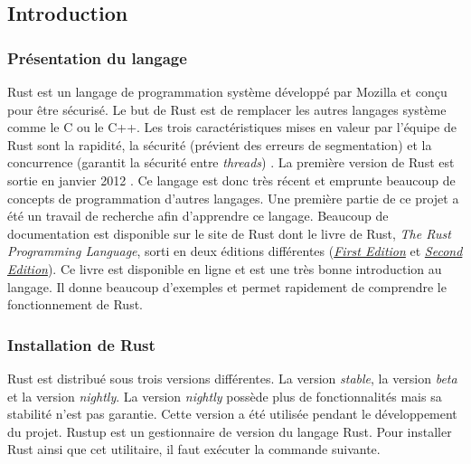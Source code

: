 
\subsection{Introduction}
\subsubsection{Présentation du langage}
Rust est un langage de programmation système développé par Mozilla et conçu pour
être sécurisé. Le but de Rust est de remplacer les autres langages système comme
le C ou le C++. Les trois caractéristiques mises en valeur par l'équipe de Rust
sont la rapidité, la sécurité (prévient des erreurs de segmentation) et la concurrence
(garantit la sécurité entre \textit{threads}) \cite{ref27}. La première version
de Rust est sortie en janvier 2012 \cite{ref28}. Ce langage est donc très récent
et emprunte beaucoup de concepts de programmation d'autres langages. Une première
partie de ce projet a été un travail de recherche afin d'apprendre ce langage.
Beaucoup de documentation est disponible sur le site de Rust dont le livre
de Rust, \textit{The Rust Programming Language}, sorti en deux éditions différentes
(\href{https://doc.rust-lang.org/book/first-edition}{\textit{First Edition}} et
\href{https://doc.rust-lang.org/book/second-edition}{\textit{Second Edition}}).
Ce livre est disponible en ligne et est une très bonne introduction au langage.
Il donne beaucoup d'exemples et permet rapidement de comprendre le fonctionnement de
Rust.


\subsubsection{Installation de Rust}
Rust est distribué sous trois versions différentes. La version \textit{stable},
la version \textit{beta} et la version \textit{nightly}. La version \textit{nightly}
possède plus de fonctionnalités mais sa stabilité n'est pas garantie. Cette version
a été utilisée pendant le développement du projet. Rustup est un gestionnaire de
version du langage Rust. Pour installer Rust ainsi que cet utilitaire, il faut
exécuter la commande suivante.



